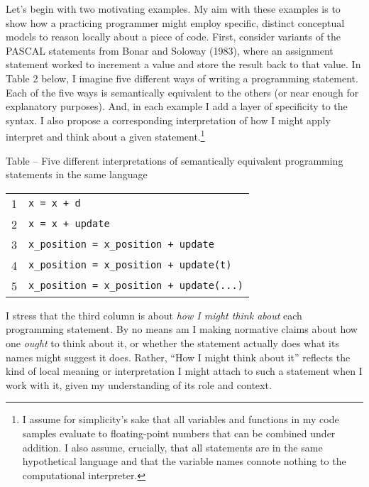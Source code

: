 Let's begin with two motivating examples. My aim with these examples is
to show how a practicing programmer might employ specific, distinct
conceptual models to reason locally about a piece of code. First,
consider variants of the PASCAL statements from Bonar and Soloway
(1983), where an assignment statement worked to increment a value and
store the result back to that value. In Table 2 below, I imagine five
different ways of writing a programming statement. Each of the five ways
is semantically equivalent to the others (or near enough for explanatory
purposes). And, in each example I add a layer of specificity to the
syntax. I also propose a corresponding interpretation of how I might
apply interpret and think about a given statement.\footnote{I assume for
  simplicity's sake that all variables and functions in my code samples
  evaluate to floating-point numbers that can be combined under
  addition. I also assume, crucially, that all statements are in the
  same hypothetical language and that the variable names connote nothing
  to the computational interpreter.}

\protect\hypertarget{ux5fToc252445956}{}{}Table -- Five different
interpretations of semantically equivalent programming statements in the
same language

\begin{center}
  \begin{tabular}{ | l | l |}
    1 & \texttt{x\ =\ x\ +\ d} \\
    2 & \texttt{x\ =\ x\ +\ update} \\
    3 & \texttt{x\_position\ =\ x\_position\ +\ update} \\
    4 & \texttt{x\_position\ =\ x\_position\ +\ update(t)} \\
    5 & \texttt{x\_position\ =\ x\_position\ +\ update(...)} \\
  \end{tabular}
\end{center}


I stress that the third column is about \emph{how I might think about}
each programming statement\emph{.} By no means am I making normative
claims about how one \emph{ought} to think about it, or whether the
statement actually does what its names might suggest it does. Rather,
``How I might think about it'' reflects the kind of local meaning or
interpretation I might attach to such a statement when I work with it,
given my understanding of its role and context.

